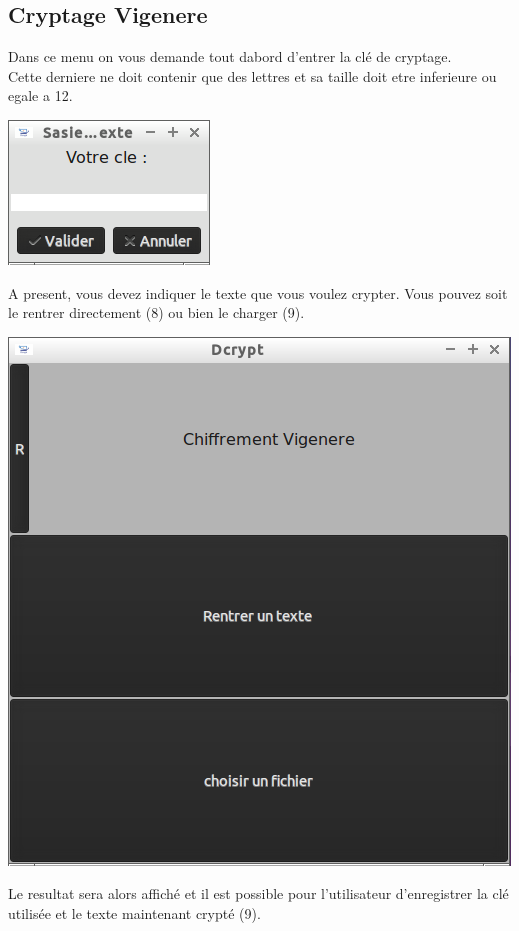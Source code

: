 \documentclass[a4]{article}
\begin{document}
		\subsection{Cryptage Vigenere}
		Dans ce menu on vous demande tout dabord d'entrer la clé de cryptage.\\
 		Cette derniere ne doit contenir que des lettres et sa taille doit etre inferieure ou egale a 12.
			\begin{center}\includegraphics[scale=0.4]{22.png}\end{center}
			A present, vous devez indiquer le texte que vous voulez crypter. Vous pouvez soit
 			le rentrer directement (8) ou bien le charger (9).
			\begin{center}\includegraphics[scale=0.4]{6.png}\end{center}
		Le resultat sera alors affiché et il est possible pour l'utilisateur 
 			d'enregistrer la clé utilisée et le texte maintenant crypté (9).
\end{document}

